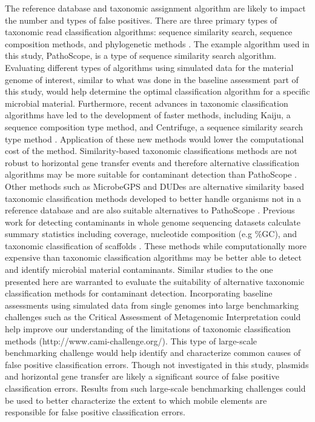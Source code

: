 \documentclass[fleqn,10pt,lineno]{wlpeerj}\usepackage[]{graphicx}\usepackage[]{color}
\begin{document}
The reference database and taxonomic assignment algorithm are likely to impact the number and types of false positives. 
There are three primary types of taxonomic read classification algorithms: sequence similarity search, sequence composition methods, and phylogenetic methods \citep{Bazinet2012}. 
The example algorithm used in this study, PathoScope, is a type of sequence similarity search algorithm. 
Evaluating different types of algorithms using simulated data for the material genome of interest, similar to what was done in the baseline assessment part of this study, would help determine the optimal classification algorithm for a specific microbial material. 
Furthermore, recent advances in taxonomic classification algorithms have led to the development of faster methods, including Kaiju, a sequence composition type method, and Centrifuge, a sequence similarity search type method \citep{menzel2016fast,Kim2016-ir}. 
Application of these new methods would lower the computational cost of the method. 
Similarity-based taxonomic classifications methods are not robust to horizontal gene transfer events and therefore alternative classification algorithms may be more suitable for contaminant detection than PathoScope \citep{kunin2008bioinformatician,weng2010reanalyze}.
Other methods such as MicrobeGPS and DUDes are alternative similarity based taxonomic classification methods developed to better handle organisms not in a reference database and are also suitable alternatives to PathoScope \citep{lindner2015metagenomic,piro2016dudes}. 
Previous work for detecting contaminants in whole genome sequencing datasets calculate summary statistics including coverage, nucleotide composition (e.g \%GC), and taxonomic classification of scaffolds \citep{kumar2013blobology,delmont2016identifying}. 
These methods while computationally more expensive than taxonomic classification algorithms may be better able to detect and identify microbial material contaminants. 
Similar studies to the one presented here are warranted to evaluate the suitability of alternative taxonomic classification methods for contaminant detection. 
Incorporating baseline assessments using simulated data from single genomes into large benchmarking challenges such as the Critical Assessment of Metagenomic Interpretation could help improve our understanding of the limitations of taxonomic classification methods (http://www.cami-challenge.org/)\citep{sczyrba2017critical}. 
This type of large-scale benchmarking challenge would help identify and characterize common causes of false positive classification errors. 
Though not investigated in this study, plasmids and horizontal gene transfer are likely a significant source of false positive classification errors. 
Results from such large-scale benchmarking challenges could be used to better characterize the extent to which mobile elements are responsible for false positive classification errors. 
\end{document}
